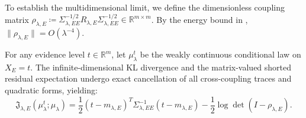 To establish the multidimensional limit, we define the dimensionless coupling matrix $\rho_{\lambda,E} \coloneqq \Sigma_{\lambda,EE}^{-1/2} R_{\lambda,E} \Sigma_{\lambda,EE}^{-1/2} \in \mathbb{R}^{m \times m}$. By the energy bound in , $\|\rho_{\lambda,E}\| = O(\lambda^{-4})$.

\begin{theorem}
  \label{thm:multidim_cancellation}
  For any evidence level $t \in \mathbb{R}^m$, let $\mu_{\lambda}^t$ be the weakly continuous conditional law on $X_E = t$. The infinite-dimensional KL divergence and the matrix-valued shorted residual expectation undergo exact cancellation of all cross-coupling traces and quadratic forms, yielding:
  \begin{equation}
    \label{eq:multidim_exact_cancellation}
    \mathfrak{J}_{\lambda,E}(\mu_\lambda^t; \mu_\lambda) = \frac{1}{2} (t - m_{\lambda,E})^T \Sigma_{\lambda,EE}^{-1} (t - m_{\lambda,E}) - \frac{1}{2}\log\det(I-\rho_{\lambda,E}).
  \end{equation}
\end{theorem}
